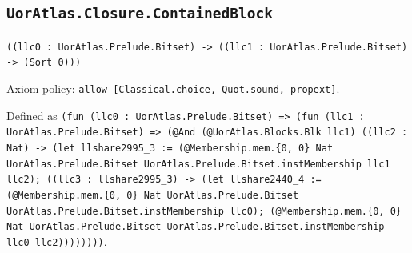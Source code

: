 \documentclass[11pt]{article}
\begin{document}
\subsection*{\texttt{UorAtlas.Closure.ContainedBlock}}
\noindent\texttt{((llc0 : UorAtlas.Prelude.Bitset) -> ((llc1 : UorAtlas.Prelude.Bitset) -> (Sort 0)))}\par
\noindent Axiom policy: \texttt{allow [Classical.choice, Quot.sound, propext]}.\par
\noindent Defined as \texttt{(fun (llc0 : UorAtlas.Prelude.Bitset) => (fun (llc1 : UorAtlas.Prelude.Bitset) => (@And (@UorAtlas.Blocks.Blk llc1) ((llc2 : Nat) -> (let llshare2995\_3 := (@Membership.mem.\{0, 0\} Nat UorAtlas.Prelude.Bitset UorAtlas.Prelude.Bitset.instMembership llc1 llc2); ((llc3 : llshare2995\_3) -> (let llshare2440\_4 := (@Membership.mem.\{0, 0\} Nat UorAtlas.Prelude.Bitset UorAtlas.Prelude.Bitset.instMembership llc0); (@Membership.mem.\{0, 0\} Nat UorAtlas.Prelude.Bitset UorAtlas.Prelude.Bitset.instMembership llc0 llc2))))))))}.\par
\end{document}
